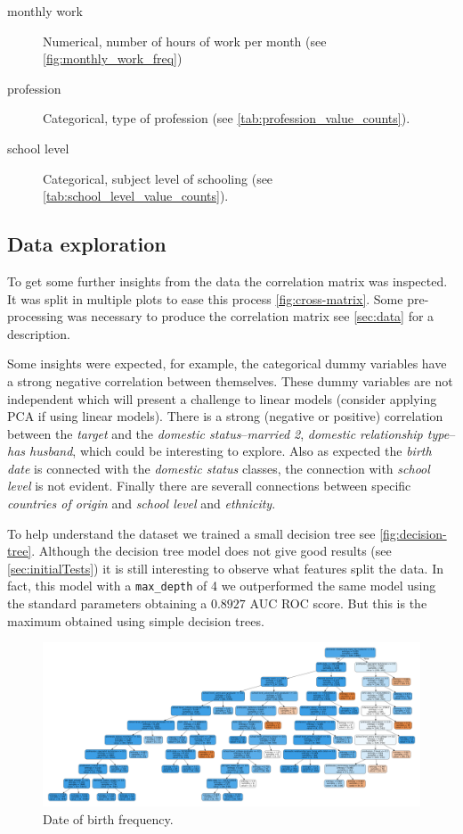 \begin{description}
\item [monthly work] Numerical, number of hours of work per month
    (see \vref{fig:monthly_work_freq})

\item [profession] Categorical, type of profession
    (see \vref{tab:profession_value_counts}).

\item [school level] Categorical, subject level of schooling
    (see \vref{tab:school_level_value_counts}).

\end{description}


\subsection{Data exploration}
\label{subsec:exploration}

To get some further insights from the data the correlation matrix was
inspected.
It was split in multiple plots to ease this process \vref{fig:cross-matrix}.
Some pre-processing was necessary to produce the correlation matrix
see \vref{sec:data} for a description.

Some insights were expected, for example, the categorical dummy variables
have a strong negative correlation between themselves.
These dummy variables are not independent which will present a challenge
to linear models (consider applying PCA if using linear models).
There is a strong (negative or positive) correlation between the \emph{target}
and the \emph{domestic status}--\emph{married 2},
\emph{domestic relationship type}--\emph{has husband}, which could be
interesting to explore.
Also as expected the \emph{birth date} is connected with the
\emph{domestic status} classes, the connection with \emph{school level} is
not evident.
Finally there are severall connections between specific \emph{countries of
origin} and \emph{school level} and \emph{ethnicity}.

To help understand the dataset we trained a small decision tree see
\vref{fig:decision-tree}.
Although the decision tree model does not give good results (see
\vref{sec:initialTests}) it is still interesting to observe what features
split the data.
In fact, this model with a \verb+max_depth+ of 4 we outperformed the same
model using the standard parameters obtaining a \(0.8927\) AUC ROC score.
But this is the maximum obtained using simple decision trees.

\begin{figure}[!h]
    \caption{Date of birth frequency.}
    \label{fig:decision-tree}
    \centering
    \includegraphics[width=\textwidth]{./img/decision-tree.png}
\end{figure}

